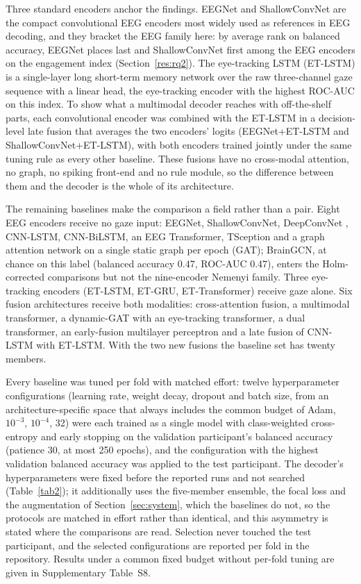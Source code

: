 \documentclass[pdflatex,sn-basic,Numbered,twocolumn,iicol]{sn-jnl}
\theoremstyle{thmstyleone}%
\theoremstyle{thmstyletwo}%
\theoremstyle{thmstylethree}%
\begin{document}
Three standard encoders anchor the findings. EEGNet \cite{ref50} and ShallowConvNet \cite{ref51} are the compact convolutional EEG encoders most widely used as references in EEG decoding, and they bracket the EEG family here: by average rank on balanced accuracy, EEGNet places last and ShallowConvNet first among the EEG encoders on the engagement index (Section~\ref{res:rq2}). The eye-tracking LSTM (ET-LSTM) is a single-layer long short-term memory network over the raw three-channel gaze sequence with a linear head, the eye-tracking encoder with the highest ROC-AUC on this index. To show what a multimodal decoder reaches with off-the-shelf parts, each convolutional encoder was combined with the ET-LSTM in a decision-level late fusion that averages the two encoders' logits (EEGNet+ET-LSTM and ShallowConvNet+ET-LSTM), with both encoders trained jointly under the same tuning rule as every other baseline. These fusions have no cross-modal attention, no graph, no spiking front-end and no rule module, so the difference between them and the decoder is the whole of its architecture.

The remaining baselines make the comparison a field rather than a pair. Eight EEG encoders receive no gaze input: EEGNet, ShallowConvNet, DeepConvNet \cite{ref51}, CNN-LSTM, CNN-BiLSTM, an EEG Transformer, TSception \cite{ref52} and a graph attention network on a single static graph per epoch (GAT); BrainGCN, at chance on this label (balanced accuracy 0.47, ROC-AUC 0.47), enters the Holm-corrected comparisons but not the nine-encoder Nemenyi family. Three eye-tracking encoders (ET-LSTM, ET-GRU, ET-Transformer) receive gaze alone. Six fusion architectures receive both modalities: cross-attention fusion, a multimodal transformer, a dynamic-GAT with an eye-tracking transformer, a dual transformer, an early-fusion multilayer perceptron and a late fusion of CNN-LSTM with ET-LSTM. With the two new fusions the baseline set has twenty members.

Every baseline was tuned per fold with matched effort: twelve hyperparameter configurations (learning rate, weight decay, dropout and batch size, from an architecture-specific space that always includes the common budget of Adam, $10^{-3}$, $10^{-4}$, 32) were each trained as a single model with class-weighted cross-entropy and early stopping on the validation participant's balanced accuracy (patience 30, at most 250 epochs), and the configuration with the highest validation balanced accuracy was applied to the test participant. The decoder's hyperparameters were fixed before the reported runs and not searched (Table~\ref{tab2}); it additionally uses the five-member ensemble, the focal loss and the augmentation of Section~\ref{sec:system}, which the baselines do not, so the protocols are matched in effort rather than identical, and this asymmetry is stated where the comparisons are read. Selection never touched the test participant, and the selected configurations are reported per fold in the repository. Results under a common fixed budget without per-fold tuning are given in Supplementary Table~S8.
\end{document}
